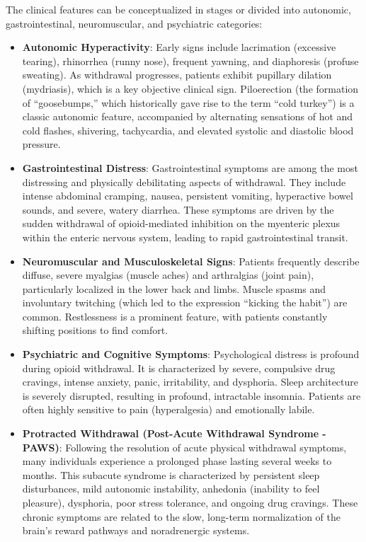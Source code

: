 The clinical features can be conceptualized in stages or divided into autonomic, gastrointestinal, neuromuscular, and psychiatric categories:
\begin{itemize}
    \item \textbf{Autonomic Hyperactivity}: Early signs include lacrimation (excessive tearing), rhinorrhea (runny nose), frequent yawning, and diaphoresis (profuse sweating). As withdrawal progresses, patients exhibit pupillary dilation (mydriasis), which is a key objective clinical sign. Piloerection (the formation of ``goosebumps,'' which historically gave rise to the term ``cold turkey'') is a classic autonomic feature, accompanied by alternating sensations of hot and cold flashes, shivering, tachycardia, and elevated systolic and diastolic blood pressure.
    \item \textbf{Gastrointestinal Distress}: Gastrointestinal symptoms are among the most distressing and physically debilitating aspects of withdrawal. They include intense abdominal cramping, nausea, persistent vomiting, hyperactive bowel sounds, and severe, watery diarrhea. These symptoms are driven by the sudden withdrawal of opioid-mediated inhibition on the myenteric plexus within the enteric nervous system, leading to rapid gastrointestinal transit.
    \item \textbf{Neuromuscular and Musculoskeletal Signs}: Patients frequently describe diffuse, severe myalgias (muscle aches) and arthralgias (joint pain), particularly localized in the lower back and limbs. Muscle spasms and involuntary twitching (which led to the expression ``kicking the habit'') are common. Restlessness is a prominent feature, with patients constantly shifting positions to find comfort.
    \item \textbf{Psychiatric and Cognitive Symptoms}: Psychological distress is profound during opioid withdrawal. It is characterized by severe, compulsive drug cravings, intense anxiety, panic, irritability, and dysphoria. Sleep architecture is severely disrupted, resulting in profound, intractable insomnia. Patients are often highly sensitive to pain (hyperalgesia) and emotionally labile.
    \item \textbf{Protracted Withdrawal (Post-Acute Withdrawal Syndrome - PAWS)}: Following the resolution of acute physical withdrawal symptoms, many individuals experience a prolonged phase lasting several weeks to months. This subacute syndrome is characterized by persistent sleep disturbances, mild autonomic instability, anhedonia (inability to feel pleasure), dysphoria, poor stress tolerance, and ongoing drug cravings. These chronic symptoms are related to the slow, long-term normalization of the brain's reward pathways and noradrenergic systems.
\end{itemize}

